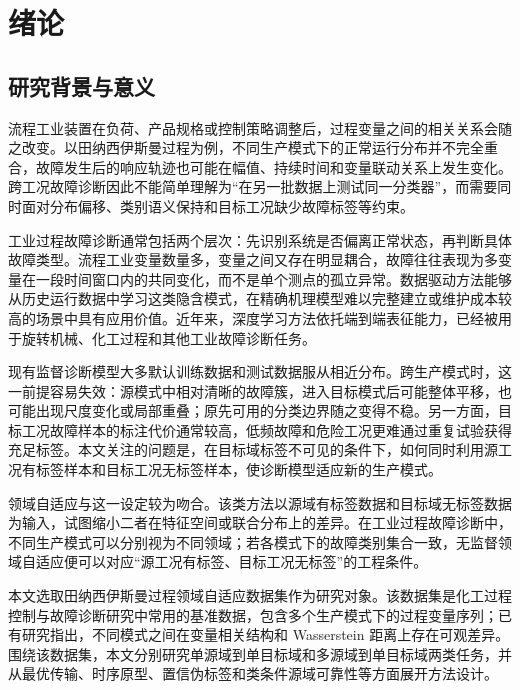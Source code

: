 \documentclass{seuthesis-2022}
\begin{document}
\tableofcontents

\mainmatter

\chapter{绪论}


\section{研究背景与意义}

流程工业装置在负荷、产品规格或控制策略调整后，过程变量之间的相关关系会随之改变。以田纳西伊斯曼过程为例，不同生产模式下的正常运行分布并不完全重合，故障发生后的响应轨迹也可能在幅值、持续时间和变量联动关系上发生变化。跨工况故障诊断因此不能简单理解为“在另一批数据上测试同一分类器”，而需要同时面对分布偏移、类别语义保持和目标工况缺少故障标签等约束。

工业过程故障诊断通常包括两个层次：先识别系统是否偏离正常状态，再判断具体故障类型。流程工业变量数量多，变量之间又存在明显耦合，故障往往表现为多变量在一段时间窗口内的共同变化，而不是单个测点的孤立异常。数据驱动方法能够从历史运行数据中学习这类隐含模式，在精确机理模型难以完整建立或维护成本较高的场景中具有应用价值。近年来，深度学习方法依托端到端表征能力，已经被用于旋转机械、化工过程和其他工业故障诊断任务\cite{lei2020applications,wang2025comprehensive}。

现有监督诊断模型大多默认训练数据和测试数据服从相近分布。跨生产模式时，这一前提容易失效：源模式中相对清晰的故障簇，进入目标模式后可能整体平移，也可能出现尺度变化或局部重叠；原先可用的分类边界随之变得不稳。另一方面，目标工况故障样本的标注代价通常较高，低频故障和危险工况更难通过重复试验获得充足标签。本文关注的问题是，在目标域标签不可见的条件下，如何同时利用源工况有标签样本和目标工况无标签样本，使诊断模型适应新的生产模式。

领域自适应与这一设定较为吻合。该类方法以源域有标签数据和目标域无标签数据为输入，试图缩小二者在特征空间或联合分布上的差异\cite{pan2009survey,wang2025comprehensive}。在工业过程故障诊断中，不同生产模式可以分别视为不同领域；若各模式下的故障类别集合一致，无监督领域自适应便可以对应“源工况有标签、目标工况无标签”的工程条件。

本文选取田纳西伊斯曼过程领域自适应数据集作为研究对象。该数据集是化工过程控制与故障诊断研究中常用的基准数据，包含多个生产模式下的过程变量序列；已有研究指出，不同模式之间在变量相关结构和 Wasserstein 距离上存在可观差异\cite{montesuma2024benchmark}。围绕该数据集，本文分别研究单源域到单目标域和多源域到单目标域两类任务，并从最优传输、时序原型、置信伪标签和类条件源域可靠性等方面展开方法设计。
\end{document}
